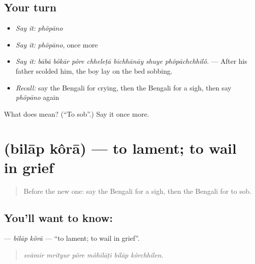\subsection*{Your turn}
\begin{itemize}
\raggedright
  \item \emph{Say it:} \emph{phõpāno}
  \item \emph{Say it:} \emph{phõpāno}, once more
  \item \emph{Say it:} \emph{bābā bôkār pôre chheleṭā bichhānāy shuye phõpāchchhilô.} — After his father scolded him, the boy lay on the bed sobbing.
  \item \emph{Recall:} say the Bengali for crying, then the Bengali for a sigh, then say \emph{phõpāno} again
\end{itemize}

\begin{tcolorbox}[breakable,colback=teal!4,colframe=teal!35!black,title={Before you move on}]
What does  mean? (\textquotedblleft{}To sob\textquotedblright{}.) Say it once more.
\end{tcolorbox}
\section[\texorpdfstring{\bn{বিলাপ} \bn{করা} (bilāp kôrā)}{বিলাপ করা (bilāp kôrā)}]{  (bilāp kôrā) — to lament; to wail in grief}

\label{lesson:BN-C445-bilap-kora}



\begin{quote}
Before the new one: say the Bengali for a sigh, then the Bengali for to sob.
\end{quote}

\subsection*{You'll want to know:  }
\textbf{ } — \emph{bilāp kôrā} — \textquotedblleft{}to lament; to wail in grief\textquotedblright{}.

\begin{quote}
     
\end{quote}

\begin{quote}
\emph{svāmīr mrityur pôre môhilāṭi bilāp kôrchhilen.}
\end{quote}

